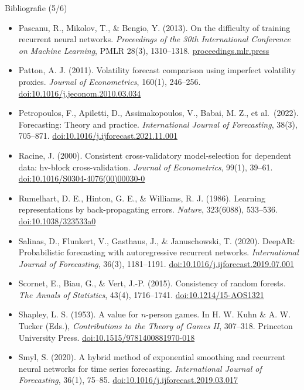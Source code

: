 \begin{frame}{Bibliografie (5/6)}
\itemsize{\tiny}
\begin{itemize}
    \item Pascanu, R., Mikolov, T., \& Bengio, Y. (2013). On the difficulty of training recurrent neural networks. \textit{Proceedings of the 30th International Conference on Machine Learning}, PMLR 28(3), 1310--1318. \href{https://proceedings.mlr.press/v28/pascanu13.html}{proceedings.mlr.press}
    \item Patton, A. J. (2011). Volatility forecast comparison using imperfect volatility proxies. \textit{Journal of Econometrics}, 160(1), 246--256. \href{https://doi.org/10.1016/j.jeconom.2010.03.034}{doi:10.1016/j.jeconom.2010.03.034}
    \item Petropoulos, F., Apiletti, D., Assimakopoulos, V., Babai, M. Z., et al.\ (2022). Forecasting: Theory and practice. \textit{International Journal of Forecasting}, 38(3), 705--871. \href{https://doi.org/10.1016/j.ijforecast.2021.11.001}{doi:10.1016/j.ijforecast.2021.11.001}
    \item Racine, J. (2000). Consistent cross-validatory model-selection for dependent data: hv-block cross-validation. \textit{Journal of Econometrics}, 99(1), 39--61. \href{https://doi.org/10.1016/S0304-4076(00)00030-0}{doi:10.1016/S0304-4076(00)00030-0}
    \item Rumelhart, D. E., Hinton, G. E., \& Williams, R. J. (1986). Learning representations by back-propagating errors. \textit{Nature}, 323(6088), 533--536. \href{https://doi.org/10.1038/323533a0}{doi:10.1038/323533a0}
    \item Salinas, D., Flunkert, V., Gasthaus, J., \& Januschowski, T. (2020). DeepAR: Probabilistic forecasting with autoregressive recurrent networks. \textit{International Journal of Forecasting}, 36(3), 1181--1191. \href{https://doi.org/10.1016/j.ijforecast.2019.07.001}{doi:10.1016/j.ijforecast.2019.07.001}
    \item Scornet, E., Biau, G., \& Vert, J.-P. (2015). Consistency of random forests. \textit{The Annals of Statistics}, 43(4), 1716--1741. \href{https://doi.org/10.1214/15-AOS1321}{doi:10.1214/15-AOS1321}
    \item Shapley, L. S. (1953). A value for $n$-person games. In H. W. Kuhn \& A. W. Tucker (Eds.), \textit{Contributions to the Theory of Games II}, 307--318. Princeton University Press. \href{https://doi.org/10.1515/9781400881970-018}{doi:10.1515/9781400881970-018}
    \item Smyl, S. (2020). A hybrid method of exponential smoothing and recurrent neural networks for time series forecasting. \textit{International Journal of Forecasting}, 36(1), 75--85. \href{https://doi.org/10.1016/j.ijforecast.2019.03.017}{doi:10.1016/j.ijforecast.2019.03.017}

\end{itemize}
\end{frame}
